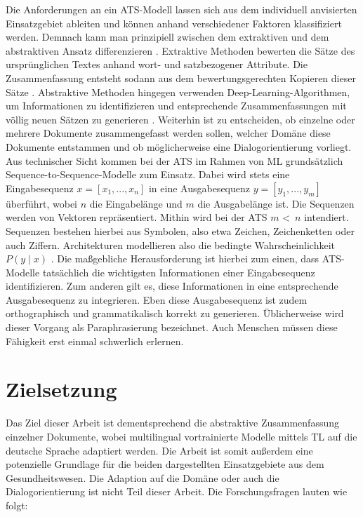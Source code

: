 \noindent
Die Anforderungen an ein \ac{ATS}-Modell lassen sich aus dem individuell anvisierten Einsatzgebiet ableiten und können anhand verschiedener Faktoren klassifiziert werden. Demnach kann man prinzipiell zwischen dem extraktiven und dem abstraktiven Ansatz differenzieren \cite[S.~5]{GAM16}. Extraktive Methoden bewerten die Sätze des ursprünglichen Textes anhand wort- und satzbezogener Attribute. Die Zusammenfassung entsteht sodann aus dem bewertungsgerechten Kopieren dieser Sätze \cite[S.~205-207]{KIA17}. Abstraktive Methoden hingegen verwenden Deep-Learning-Algorithmen, um Informationen zu identifizieren und entsprechende Zusammenfassungen mit völlig neuen Sätzen zu generieren \cite[S.~1]{NIT19}. Weiterhin ist zu entscheiden, ob einzelne oder mehrere Dokumente zusammengefasst werden sollen, welcher Domäne diese Dokumente entstammen und ob möglicherweise eine Dialogorientierung vorliegt.\\

\noindent
Aus technischer Sicht kommen bei der \ac{ATS} im Rahmen von \ac{ML} grundsätzlich Sequence-to-Sequence-Modelle zum Einsatz. Dabei wird stets eine Eingabesequenz $x = [x_{1}, ..., x_{n}]$ in eine Ausgabesequenz $y = [y_{1}, ..., y_{m}]$ überführt, wobei $n$ die Eingabelänge und $m$ die Ausgabelänge ist. Die Sequenzen werden von Vektoren repräsentiert. Mithin wird bei der \ac{ATS} $m$ \textless \, $n$ intendiert. Sequenzen bestehen hierbei aus Symbolen, also etwa Zeichen, Zeichenketten oder auch Ziffern. Architekturen modellieren also die bedingte Wahrscheinlichkeit $P(y \mid x)$ \cite[S.~32-33]{NIT19}. Die maßgebliche Herausforderung ist hierbei zum einen, dass \ac{ATS}-Modelle tatsächlich die wichtigsten Informationen einer Eingabesequenz identifizieren. Zum anderen gilt es, diese Informationen in eine entsprechende Ausgabesequenz zu integrieren. Eben diese Ausgabesequenz ist zudem orthographisch und grammatikalisch korrekt zu generieren. Üblicherweise wird dieser Vorgang als Paraphrasierung bezeichnet. Auch Menschen müssen diese Fähigkeit erst einmal schwerlich erlernen.
\newpage


\section{Zielsetzung}
\noindent
Das Ziel dieser Arbeit ist dementsprechend die abstraktive Zusammenfassung einzelner Dokumente, wobei multilingual vortrainierte Modelle mittels \ac{TL} auf die deutsche Sprache adaptiert werden. Die Arbeit ist somit außerdem eine potenzielle Grundlage für die beiden dargestellten Einsatzgebiete aus dem Gesundheitswesen. Die Adaption auf die Domäne oder auch die Dialogorientierung ist nicht Teil dieser Arbeit. Die Forschungsfragen lauten wie folgt:

